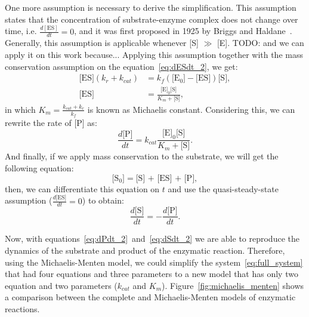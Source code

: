 One more assumption is necessary to derive the simplification. This 
assumption states that the concentration of substrate-enzyme complex
does not change over time, i.e. $\frac{d[\text{ES}]}{dt} = 0$, and it 
was first proposed in 1925 by Briggs and Haldane~\cite{Briggs1925}. 
Generally, this assumption is applicable whenever [S] $\gg$ [E]. 
{\color{blue} TODO: and we can apply it on this work because...}
Applying this assumption together with the mass conservation assumption 
on the equation~\ref{eq:dESdt_2}, we get:
\begin{equation*}  
    \begin{aligned}
        \text{[ES]} (k_r + k_{cat}) &= 
            k_f(\text{[E$_0$]} - \text{[ES]})\text{[S]}, \\
        \text{[ES]} &= \frac{\text{[E]}_0\text{[S]}}{K_m + \text{[S]}}, 
    \end{aligned}
\end{equation*}
in which $K_m = \frac{k_{cat} + k_r}{k_f}$ is known as Michaelis 
constant. Considering this, we can rewrite the rate of [P] as:
\begin{equation}
    \frac{d\text{[P]}}{dt} = k_{cat}\frac{\text{[E]}_0\text{[S]}}
        {K_m + \text{[S]}}.
    \label{eq:dPdt_2}
\end{equation}
And finally, if we apply mass conservation to the substrate, we will get
the following equation:
\begin{equation*}
    \text{[S$_0$]} = \text{[S] + [ES] + [P]},
\end{equation*}
then, we can differentiate this equation on $t$ and use the 
quasi-steady-state assumption ($\frac{d\text{[ES]}}{dt} = 0$) to obtain:
\begin{equation}
    \frac{d\text{[S]}}{dt} = - \frac{d\text{[P]}}{dt}.
    \label{eq:dSdt_2}
\end{equation}

Now, with equations~\ref{eq:dPdt_2}~and~\ref{eq:dSdt_2} we are able to
reproduce the dynamics of the substrate and product of the enzymatic 
reaction. Therefore, using the Michaelis-Menten model, we could simplify 
the system~\ref{eq:full_system} that had four equations and three 
parameters to a new model that has only two equation and two parameters 
($k_{cat}$ and $K_m$). Figure~\ref{fig:michaelis_menten} shows a 
comparison between the complete and Michaelis-Menten models of enzymatic 
reactions.

